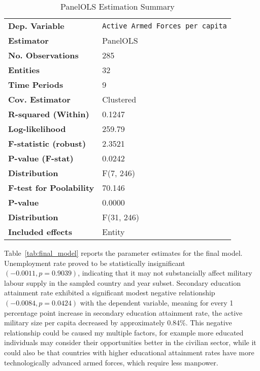 \begin{table}[htbp]
\caption{PanelOLS Estimation Summary}
\centering
\begin{threeparttable}
\label{tab:panelols_summary}
\begin{tabularx}{\textwidth}{@{}lX@{}}
\toprule
\textbf{Dep. Variable} & \texttt{Active Armed Forces per capita} \\
\textbf{Estimator} & PanelOLS \\
\textbf{No. Observations} & 285 \\
\textbf{Entities} & 32 \\
\textbf{Time Periods} & 9 \\
\textbf{Cov. Estimator} & Clustered \\
\midrule
\textbf{R-squared (Within)} & 0.1247 \\
\textbf{Log-likelihood} & 259.79 \\
\textbf{F-statistic (robust)} & 2.3521 \\
\textbf{P-value (F-stat)} & 0.0242 \\
\textbf{Distribution} & F(7, 246) \\
\midrule
\textbf{F-test for Poolability} & 70.146 \\
\textbf{P-value} & 0.0000 \\
\textbf{Distribution} & F(31, 246) \\
\textbf{Included effects} & Entity \\
\bottomrule
\end{tabularx}
\end{threeparttable}
\label{tab:model_summary}
\end{table}

Table~\ref{tab:final_model} reports the parameter estimates for the final model. 
Unemployment rate proved to be statistically insignificant $(-0.0011, p=0.9039)$, 
indicating that it may not substancially affect military labour supply in the sampled country and year subset.
Secondary education attainment rate exhibited a significant modest negative relationship $(-0.0084, p=0.0424)$ 
with the dependent variable, meaning for every 1 percentage point increase in secondary education 
attainment rate, the active military size per capita decreased by approximately 0.84\%.
This negative relationship could be caused my multiple factors, for example more educated individuals 
may consider their opportunities better in the civilian sector, while it could also be that countries 
with higher educational attainment rates have more technologically advanced armed forces, which require 
less manpower.


